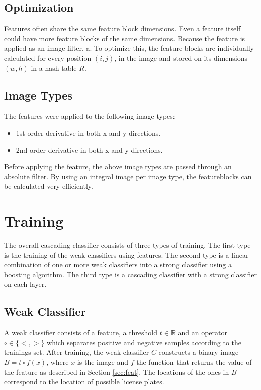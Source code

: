 \documentclass[a4paper,11pt]{article}
\begin{document}
\subsection{Optimization} \label{sec:opt}
Features often share the same feature block dimensions. Even a feature
itself could have more feature blocks of the same dimensions. Because the
feature is applied as an image filter, a.
To optimize this, the feature blocks are individually calculated for every
position $(i,j)$, in the image and stored on its dimensions $(w,h)$ in a hash
table $R$.

\subsection{Image Types} \label{sec:image}
The features were applied to the following image types:
\begin{itemize}
	\item{1st order derivative in both x and y directions.}
	\item{2nd order derivative in both x and y directions.}
\end{itemize}
Before applying the feature, the above image types are passed through an
absolute filter. By using an integral image \cite{viola} per image type, the
featureblocks can be calculated very efficiently.


\section{Training} \label{sec:train}
The overall cascading classifier consists of three types of training. The first
type is the training of the weak classifiers using features. The second type is
a linear combination of one or more weak classifiers into a strong classifier
using a boosting algorithm. The third type is a cascading classifier
with a strong classifier on each layer.

\subsection{Weak Classifier} \label{sec:weak}
A weak classifier consists of a feature, a threshold $t \in \mathbb{R}$ and an
operator $\circ \in \{<, >\}$ which separates positive and negative samples
according to the trainings set. After training, the weak classifier $C$
constructs a binary image $B = t \circ f(x)$, where $x$ is the image and $f$
the function that returns the value of the feature as described in 
Section \ref{sec:feat}. The locations of the ones in $B$ correspond to the location of
possible license plates.
\end{document}
